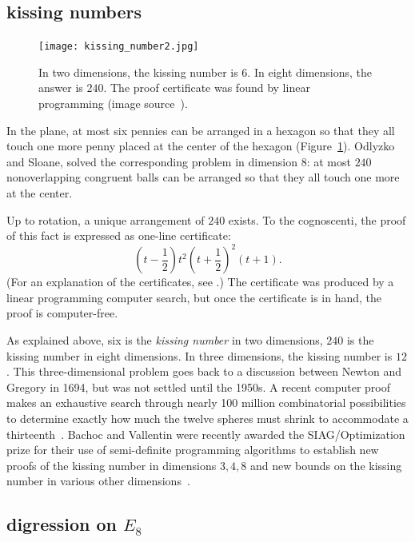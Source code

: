\documentclass{llncs}
\begin{document}
\subsection{kissing numbers} 


\begin{figure}[h!]
  \centering
\texttt{[image: kissing\_number2.jpg]}
\caption{In two dimensions, the kissing number is $6$. In eight
  dimensions, the answer is $240$.  The proof certificate was found by
  linear programming (image source~\cite{SIAG}).}
\label{fig:kissing}
\end{figure}

In the plane, at most six pennies can be arranged in a hexagon so that
they all touch one more penny placed at the center of the hexagon
(Figure~\ref{fig:kissing}).  Odlyzko and Sloane, solved the
corresponding problem in dimension $8$: at most $240$ nonoverlapping
congruent balls can be arranged so that they all touch one more at the
center.

Up to rotation, a unique arrangement of $240$ exists.  To the
cognoscenti, the proof of this fact is expressed as one-line
certificate:
\[
(t - \frac{1}{2})t^2(t + \frac{1}{2})^2 (t + 1).
\]
(For an explanation of the certificates, see \cite{PZ}.)  The
certificate was produced by a linear programming computer search, but
once the certificate is in hand, the proof is computer-free.

As explained above, six is the {\it kissing number} in two dimensions,
$240$ is the kissing number in eight dimensions. In three dimensions,
the kissing number is $12$.  This three-dimensional problem goes back
to a discussion between Newton and Gregory in 1694, but was not
settled until the 1950s.  A recent computer proof makes an exhaustive
search through nearly 100 million combinatorial possibilities to
determine exactly how much the twelve spheres must shrink to
accommodate a thirteenth~\cite{Musin-Tarasov}.  Bachoc and Vallentin
were recently awarded the SIAG/Optimization prize for their use of
semi-definite programming algorithms to establish new proofs of the
kissing number in dimensions $3,4,8$ and new bounds on the kissing
number in various other dimensions~\cite{BV08}.



\subsection{digression on $E_8$}\label{sec:e8}
\end{document}
